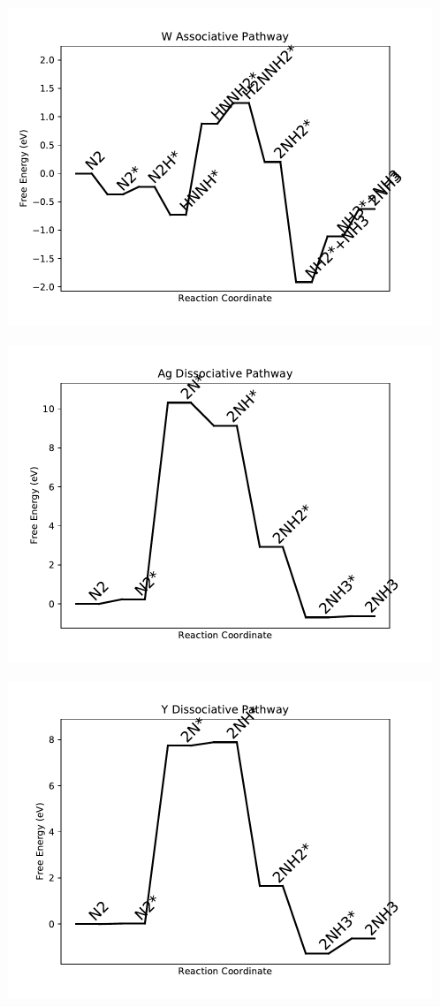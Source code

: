 \begin{figure}
\includegraphics[width=0.8\linewidth]{data/plots/W_associative.pdf}
\end{figure}

\begin{figure}
\includegraphics[width=0.8\linewidth]{data/plots/Ag_dissociative.pdf}
\end{figure}

\begin{figure}
\includegraphics[width=0.8\linewidth]{data/plots/Y_dissociative.pdf}
\end{figure}

